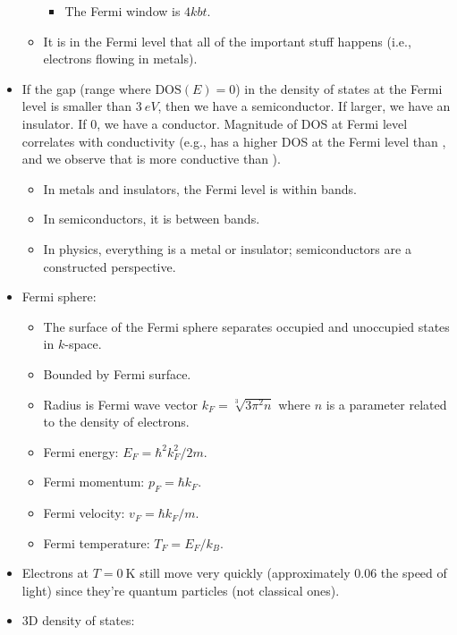 \documentclass[../notes.tex]{subfiles}
\begin{document}
\begin{itemize}
\begin{itemize}
        \begin{itemize}
            \item The Fermi window is $4kbt$.
        \end{itemize}
        \item It is in the Fermi level that all of the important stuff happens (i.e., electrons flowing in metals).
    \end{itemize}
    \item If the gap (range where $\text{DOS}(E)=0$) in the density of states at the Fermi level is smaller than $\SI{3}{eV}$, then we have a semiconductor. If larger, we have an insulator. If 0, we have a conductor. Magnitude of DOS at Fermi level correlates with conductivity (e.g.,  has a higher DOS at the Fermi level than , and we observe that  is more conductive than ).
    \begin{itemize}
        \item In metals and insulators, the Fermi level is within bands.
        \item In semiconductors, it is between bands.
        \item In physics, everything is a metal or insulator; semiconductors are a constructed perspective.
    \end{itemize}
    \item Fermi sphere:
    \begin{itemize}
        \item The surface of the Fermi sphere separates occupied and unoccupied states in $k$-space.
        \item Bounded by Fermi surface.
        \item Radius is Fermi wave vector $k_F=\sqrt[3]{3\pi^2n}$ where $n$ is a parameter related to the density of electrons.
        \item Fermi energy: $E_F=\hbar^2k_F^2/2m$.
        \item Fermi momentum: $p_F=\hbar k_F$.
        \item Fermi velocity: $v_F=\hbar k_F/m$.
        \item Fermi temperature: $T_F=E_F/k_B$.
    \end{itemize}
    \item Electrons at $T=\SI{0}{\kelvin}$ still move very quickly (approximately $0.06$ the speed of light) since they're quantum particles (not classical ones).
    \item 3D density of states:
    \begin{itemize}

\end{itemize}
\end{itemize}
\end{document}
